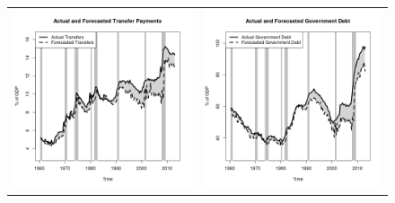 \documentclass[11pt]{article}
\begin{document}
\begin{figure}
\begin{center}
\begin{tabular}{cc}
\includegraphics[scale=0.45]{./results/pics0.02/pred_transfers.png} & \includegraphics[scale=0.45]{./results/pics0.02/pred_debt.png}  
\end{tabular}
\end{center}
\end{figure} 
\end{document}
